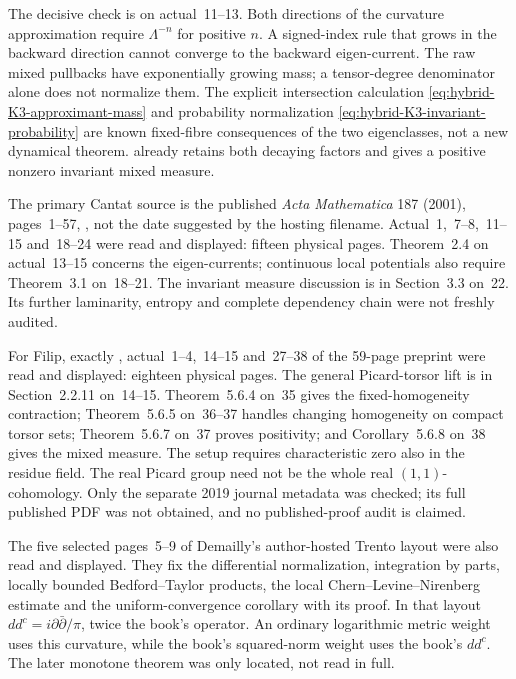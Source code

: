 The decisive check is on actual~11--13. Both directions of the
curvature approximation require $\Lambda^{-n}$ for positive $n$.
A signed-index rule that grows in the backward direction cannot
converge to the backward eigen-current. The raw mixed pullbacks
have exponentially growing mass; a tensor-degree denominator alone
does not normalize them. The explicit intersection calculation
\eqref{eq:hybrid-K3-approximant-mass} and probability normalization
\eqref{eq:hybrid-K3-invariant-probability} are known fixed-fibre
consequences of the two eigenclasses, not a new dynamical theorem.
\cite[Corollary~5.6.8]{Filip19K3V1} already retains both decaying
factors and gives a positive nonzero invariant mixed measure.

The primary Cantat source is the published \emph{Acta Mathematica}
187 (2001), pages~1--57, \cite{Cantat01K3Published}, not the date
suggested by the hosting filename. Actual~1,~7--8,~11--15 and~18--24
were read and displayed: fifteen physical pages. Theorem~2.4 on
actual~13--15 concerns the eigen-currents; continuous local potentials
also require Theorem~3.1 on~18--21. The invariant measure discussion
is in Section~3.3 on~22. Its further laminarity, entropy and complete
dependency chain were not freshly audited.

For Filip, exactly \cite{Filip19K3V1}, actual~1--4,~14--15 and~27--38
of the 59-page preprint were read and displayed: eighteen physical
pages. The general Picard-torsor lift is in Section~2.2.11 on~14--15.
Theorem~5.6.4 on~35 gives the fixed-homogeneity contraction;
Theorem~5.6.5 on~36--37 handles changing homogeneity on compact
torsor sets; Theorem~5.6.7 on~37 proves positivity; and
Corollary~5.6.8 on~38 gives the mixed measure.
The setup requires characteristic zero also in the residue field.
The real Picard group need not be the whole real $(1,1)$-cohomology.
Only the separate 2019 journal metadata was checked; its full
published PDF was not obtained, and no published-proof audit is
claimed.

The five selected pages~5--9 of Demailly's author-hosted Trento
layout were also read and displayed. They fix the differential
normalization, integration by parts, locally bounded
Bedford--Taylor products, the local Chern--Levine--Nirenberg estimate
and the uniform-convergence corollary with its proof. In that layout
$dd^c=i\partial\bar\partial/\pi$, twice the book's operator.
An ordinary logarithmic metric weight uses this curvature, while
the book's squared-norm weight uses the book's $dd^c$.
The later monotone theorem was only located, not read in full.


